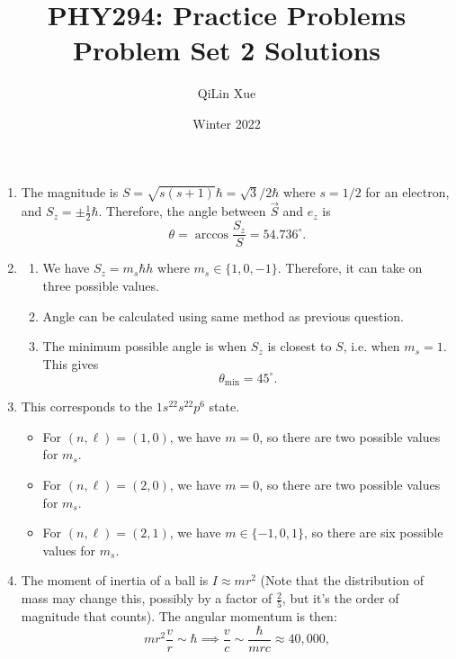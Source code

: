 \documentclass{article}
\title{PHY294: Practice Problems \\ \textbf{Problem Set 2 Solutions}}
\author{QiLin Xue}
\date{Winter 2022}
\begin{document}
\maketitle
\begin{enumerate}[label=(9.\arabic*)]
    \setcounter{enumi}{0}
    \item The magnitude is $S=\sqrt{s(s+1)}\hbar=\sqrt{3}/2\hbar$ where $s=1/2$ for an electron, and $S_z = \pm \frac{1}{2}\hbar.$ Therefore, the angle between $\vec{S}$ and $e_z$ is 
        \begin{equation}
            \theta = \arccos\frac{S_z}{S} = 54.736^\circ.
        \end{equation}
    \setcounter{enumi}{2}
    \item \begin{enumerate}
        \item We have $S_z = m_s\hbar{h}$ where $m_s\in\{1,0,-1\}$. Therefore, it can take on three possible values.
        \item Angle can be calculated using same method as previous question.
        \item The minimum possible angle is when $S_z$ is closest to $S$, i.e. when $m_s = 1.$ This gives 
        \begin{equation}
            \theta_\text{min} = 45^\circ.
        \end{equation}
    \end{enumerate}
    \setcounter{enumi}{4}
    \item This corresponds to the $1s^22s^22p^6$ state.
    \begin{itemize}
        \item For $(n,\ell) = (1,0)$, we have $m=0$, so there are two possible values for $m_s$.
        \item For $(n,\ell) = (2,0)$, we have $m=0$, so there are two possible values for $m_s$.
        \item For $(n,\ell) = (2,1)$, we have $m\in\{-1,0,1\}$, so there are six possible values for $m_s$.
    \end{itemize}
    \setcounter{enumi}{7}
    \item The moment of inertia of a ball is $I \approx mr^2$ (Note that the distribution of mass may change this, possibly by a factor of $\frac{2}{5}$, but it's the order of magnitude that counts). The angular momentum is then:
    \begin{equation}
        mr^2\frac{v}{r} \sim \hbar \implies \frac{v}{c} \sim \frac{\hbar}{mrc} \approx 40,000,
    \end{equation}

\end{enumerate}
\end{document}
